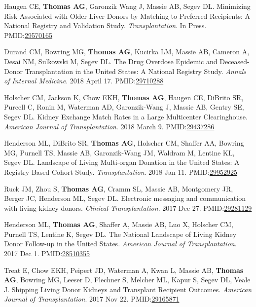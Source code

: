 \documentclass[10pt]{article}
\makeatletter
\newlength{\bibhang}
\newlength{\bibsep}
 {\@listi \global\bibsep\itemsep \global\advance\bibsep by\parsep}
\newenvironment{bibenum*}
  {\renewcommand\labelenumi{[\theenumi]}%
   \etaremune[
     topsep=0pt,
     itemsep=\bibsep,
     parsep=0pt,partopsep=0pt,
     itemindent=-\bibhang,
     leftmargin={\bibhang+\widthof{[999]}}]}
  {\endetaremune}
\newcommand{\pmid}[1]{PMID:\href{https://www.ncbi.nlm.nih.gov/pubmed/#1}{#1}}
\makeatother
\begin{document}
\begin{bibenum*}
\item Haugen CE, \textbf{Thomas AG}, Garonzik Wang J, Massie AB,
  Segev DL. Minimizing Risk Associated with Older Liver Donors by
  Matching to Preferred Recipients: A National Registry and
  Validation Study.
  \emph{Transplantation}. In Press.
  \\\pmid{29570165} 

\item Durand CM\dag, Bowring MG\dag, \textbf{Thomas AG}, Kucirka LM,
  Massie AB, Cameron A, Desai NM, Sulkowski M, Segev DL.
  The Drug Overdose Epidemic and Deceased-Donor Transplantation
  in the United States: A National Registry Study.
  \emph{Annals of Internal Medicine}. 2018 April 17.
  \pmid{29710288} 

\item Holscher CM, Jackson K, Chow EKH, \textbf{Thomas AG}, Haugen CE,
  DiBrito SR, Purcell C, Ronin M, Waterman AD, Garonzik-Wang J, Massie AB,
  Gentry SE, Segev DL. Kidney Exchange Match Rates in a Large
  Multicenter Clearinghouse.
  \emph{American Journal of Transplantation}. 2018 March 9.
  \pmid{29437286} 

\item Henderson ML\dag, DiBrito SR\dag, \textbf{Thomas AG}, Holscher CM,
  Shaffer AA, Bowring MG, Purnell TS, Massie AB, Garonzik-Wang JM,
  Waldram M, Lentine KL, Segev DL.  Landscape of Living Multi-organ
  Donation in the United States: A Registry-Based Cohort Study.
  \emph{Transplantation}. 2018 Jan 11.
  \pmid{29952925} 

\item Ruck JM, Zhou S, \textbf{Thomas AG}, Cramm SL, Massie AB,
  Montgomery JR, Berger JC, Henderson ML, Segev DL.
  Electronic messaging and communication with living kidney donors.
  \emph{Clinical Transplantation}. 2017 Dec 27.
  \pmid{29281129} 

\item Henderson ML\dag, \textbf{Thomas AG\dag}, Shaffer A, Massie AB, Luo X,
  Holscher CM, Purnell TS, Lentine K, Segev DL. The National Landscape
  of Living Kidney Donor Follow-up in the United States.
  \emph{American Journal of Transplantation}. 2017 Dec 1.
  \pmid{28510355} 

\item Treat E, Chow EKH, Peipert JD, Waterman A, Kwan L, Massie AB,
  \textbf{Thomas AG}, Bowring MG, Leeser D, Flechner S, Melcher ML, Kapur S,
  Segev DL, Veale J. Shipping Living Donor Kidneys and Transplant Recipient
  Outcomes.
  \emph{American Journal of Transplantation}. 2017 Nov 22.
  \pmid{29165871} 


\end{bibenum*}
\end{document}

